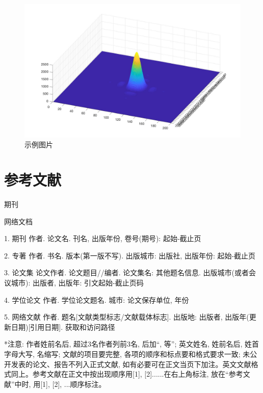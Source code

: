 \documentclass[utf8, a4paper, 10.5pt]{book}
\newcommand{\songti}{\CJKfamily{songti}}
\begin{document}
\begin{figure}[h]
\centering
\includegraphics[width=12cm]{sample.jpg}
\caption{示例图片}
\label{fig:sample}
\end{figure}





\chapter*{参考文献}
\begin{enumerate}[{[1]}]
\songti\fontsize{10.5pt}{10.5pt} %
	\item 期刊
	\item 网络文档
\end{enumerate}

1.	期刊  作者. 论文名. 刊名, 出版年份, 卷号(期号): 起始-截止页

2.	专著  作者. 书名. 版本(第一版不写). 出版城市: 出版社, 出版年份: 起始-截止页

3.	论文集  论文作者. 论文题目//编者. 论文集名: 其他题名信息. 出版城市(或者会议城市): 出版者, 出版年: 引文起始-截止页码

4.	学位论文  作者. 学位论文题名. 城市: 论文保存单位, 年份

5.	网络文献  作者. 题名[文献类型标志/文献载体标志]. 出版地: 出版者, 出版年(更新日期)[引用日期]. 获取和访问路径

*注意: 作者姓前名后, 超过3名作者列前3名, 后加“, 等”; 英文姓名, 姓前名后, 姓首字母大写, 名缩写; 文献的项目要完整, 各项的顺序和标点要和格式要求一致; 未公开发表的论文、报告不列入正式文献, 如有必要可在正文当页下加注。英文文献格式同上。参考文献在正文中按出现顺序用[1], [2]......在右上角标注, 放在“参考文献”中时, 用[1], [2], ...顺序标注。
\end{document}
